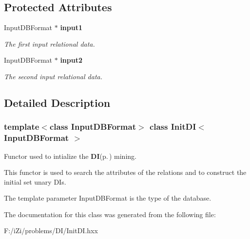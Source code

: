 \subsection*{Protected Attributes}
\begin{CompactItemize}
\item 
Input\-DBFormat $\ast$ {\bf input1}\label{class_init_d_i_fed6774c5da14031e889a7a03e713832}

\begin{CompactList}\small\item\em The first input relational data. \item\end{CompactList}\item 
Input\-DBFormat $\ast$ {\bf input2}\label{class_init_d_i_ba56efcf0b40abe4ed7bc6668f1b6fb1}

\begin{CompactList}\small\item\em The second input relational data. \item\end{CompactList}\end{CompactItemize}


\subsection{Detailed Description}
\subsubsection*{template$<$class Input\-DBFormat$>$ class Init\-DI$<$ Input\-DBFormat $>$}

Functor used to intialize the {\bf DI}{\rm (p.\,\pageref{class_d_i})} mining. 

This functor is used to search the attributes of the relations and to construct the initial set unary DIs.

The template parameter Input\-DBFormat is the type of the database. 



The documentation for this class was generated from the following file:\begin{CompactItemize}
\item 
F:/i\-Zi/problems/DI/Init\-DI.hxx\end{CompactItemize}
